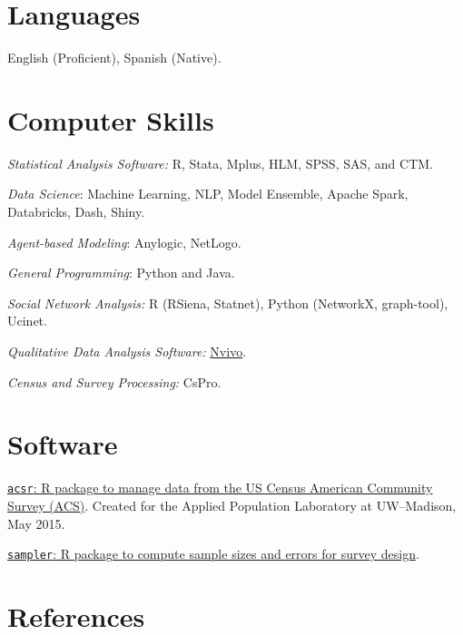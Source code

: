 \documentclass[10pt,letterpaper]{article}
\renewenvironment{itemize}{
  \begin{list}{}{
    \setlength{\leftmargin}{1.5em}
    \setlength{\itemsep}{0.25em}
    \setlength{\parskip}{0pt}
    \setlength{\parsep}{0.25em}
  }
}{
  \end{list}
}
\begin{document}
\section*{Languages}

\begin{itemize}
\item English (Proficient), Spanish (Native).
\end{itemize}

\section*{Computer Skills}

\begin{itemize}
\item \textit{Statistical Analysis Software:} R, Stata, Mplus, HLM, SPSS, SAS, and CTM.
\item \textit{Data Science}: Machine Learning, NLP, Model Ensemble, Apache Spark, Databricks, Dash, Shiny.
\item \textit{Agent-based Modeling}: Anylogic, NetLogo.
\item \textit{General Programming}: Python and Java.
\item \textit{Social Network Analysis:} R (RSiena, Statnet), Python (NetworkX, graph-tool), Ucinet.
\item \textit{Qualitative Data Analysis Software:} \href{http://www.qsrinternational.com/}{Nvivo}.
\item \textit{Census and Survey Processing:} CsPro.
\end{itemize}

\section*{Software}

\begin{itemize}
\item \href{https://github.com/sdaza/acsr}{\texttt{acsr}: R package to manage data from the US Census American Community Survey (ACS)}. Created for the Applied Population Laboratory at UW--Madison, May 2015.
\item \href{https://github.com/sdaza/sampler}{\texttt{sampler}: R package to compute sample sizes and errors for survey design}.
\end{itemize}

\section*{References}
\end{document}
